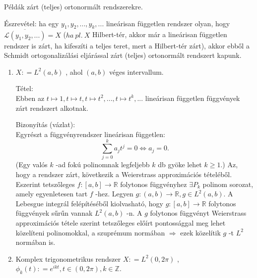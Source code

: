 \documentclass[12pt,a4paper]{scrartcl}
\providecommand{\tightlist}{%
  \setlength{\itemsep}{0pt}\setlength{\parskip}{0pt}}
\newenvironment{tetel}{}{}
\newenvironment{bizonyitas}{}{}
\newenvironment{pelda}{}{}
\begin{document}
\begin{pelda}

Példák zárt (teljes) ortonormált rendszerekre.

Észrevétel: ha egy \(y_{1},y_{2},...,y_{k},...\) lineárisan független
rendszer olyan, hogy
\(\overline{\mathcal{L}\left( {y_{1},y_{2},...} \right)} = X\)
(\(ha\ pl.\ X\) Hilbert-tér, akkor már a lineárisan független rendszer
is zárt, ha kifeszíti a teljes teret, mert a Hilbert-tér zárt), akkor
ebből a Schmidt ortogonalizálási eljárással zárt (teljes) ortonormált
rendszert kapunk.

\begin{enumerate}
\def\labelenumi{\arabic{enumi}.}
\tightlist
\item
  \(X: = L^{2}\left( {a,b} \right)\) , ahol \(\left( {a,b} \right)\)
  véges intervallum.

  \begin{tetel}

  Tétel:\\
  Ebben az
  \(\left. t\mapsto 1,t\mapsto t,t\mapsto t^{2},...,t\mapsto t^{k},... \right.\)
  lineárisan független függvények zárt rendszert alkotnak.

  \end{tetel}

  \begin{bizonyitas}

  Bizonyítás (vázlat):\\
  Egyrészt a függvényrendszer lineárisan független:
  \[\left. {\sum\limits_{j = 0}^{k}{a_{j}t^{j}}} = 0\Leftrightarrow a_{j} = 0. \right.\](Egy
  valós \(k\) -ad fokú polinomnak legfeljebb \(k\) db gyöke lehet
  \(k \geq 1\).) Az, hogy a rendszer zárt, következik a Weierstrass
  approximációs tételéből. Eszerint tetszőleges
  \(\left. f:\left\lbrack {a,b} \right\rbrack\rightarrow{\mathbb{R}} \right.\)
  folytonos függvényhez \(\exists P_{k}\) polinom sorozat, amely
  egyenletesen tart \(f\) -hez. Legyen
  \(\left. g:\left( {a,b} \right)\rightarrow{\mathbb{R}},g \in L^{2}\left( {a,b} \right) \right.\).
  A Lebesgue integrál felépítéséből kiolvasható, hogy
  \(\left. g:\left\lbrack {a,b} \right\rbrack\rightarrow{\mathbb{R}} \right.\)
  folytonos függvények sűrűn vannak \(L^{2}\left( {a,b} \right)\) -n. A
  \(g\) folytonos függvényt Weierstrass approximációs tétele szerint
  tetszőleges előírt pontossággal meg lehet közelíteni polinomokkal, a
  szuprémum normában \(\Rightarrow\) ezek közelítik \(g\) -t \(L^{2}\)
  normában is.

  \end{bizonyitas}
\item
  Komplex trigonometrikus rendszer \(X: = L^{2}\left( {0,2\pi} \right)\)
  ,
  \(\phi_{k}\left( t \right): = e^{ikt},t \in \left( {0,2\pi} \right),k \in {\mathbb{Z}}\).


\end{enumerate}
\end{pelda}
\end{document}
